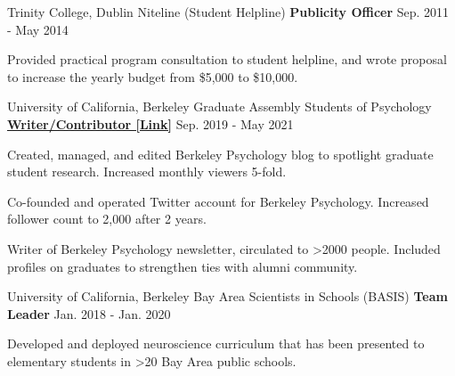 \begin{cventries}
  \cventry
  	{Trinity College, Dublin}
  	{Niteline (Student Helpline)} %
    {\textbf{Publicity Officer}} %
    {Sep. 2011 - May 2014} %
    {
      \begin{cvitems} %
        \item {Provided practical program consultation to student helpline, and wrote proposal to increase the yearly budget from \$5,000 to \$10,000.}
      \end{cvitems}
    }


  \cventry 
    {University of California, Berkeley} %
    {Graduate Assembly Students of Psychology}
    {\href{https://psychblog.berkeley.edu/opinion/2019/09/09/Graduate-School-Advice/}{\textbf{Writer/Contributor [Link]}}} %
    {Sep. 2019 - May 2021} %
    {
      \begin{cvitems} 
      	\item {Created, managed, and edited Berkeley Psychology blog to spotlight graduate student research. Increased monthly viewers 5-fold.}
      	\item {Co-founded and operated Twitter account for Berkeley Psychology. Increased follower count to 2,000 after 2 years.}
      	\item {Writer of Berkeley Psychology newsletter, circulated to >2000 people. Included profiles on graduates to strengthen ties with alumni community.}
      \end{cvitems}
    }

  \cventry
  	{University of California, Berkeley} %
  	{Bay Area Scientists in Schools (BASIS)}
    {\textbf{Team Leader}} %
    {Jan. 2018 - Jan. 2020} %
    {
      \begin{cvitems} %
        \item {Developed and deployed neuroscience curriculum that has been presented to elementary students in >20 Bay Area public schools.}
      \end{cvitems}
    }

\begin{cventries}


\end{cventries}
\end{cventries}
